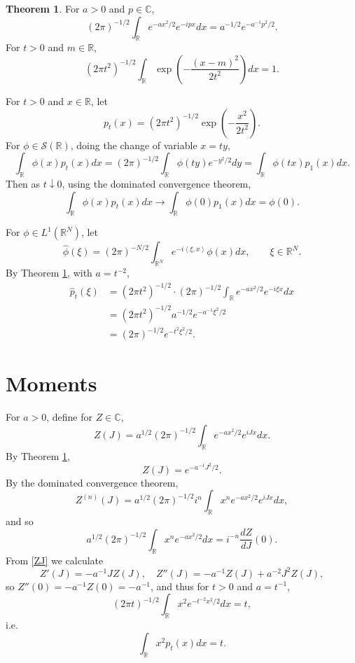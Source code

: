 \documentclass{article}
\newcommand{\inner}[2]{\left\langle #1, #2 \right\rangle}
\theoremstyle{definition}
\newtheorem{theorem}{Theorem}
\theoremstyle{definition}
\begin{document}
\begin{theorem}
For $a > 0$ and $p \in \mathbb{C}$,
\[
(2\pi)^{-1/2} \int_{\mathbb{R}} e^{-ax^2/2} e^{-ipx} dx = a^{-1/2} e^{-a^{-1} p^2 /2}.
\]
For $t>0$ and $m \in \mathbb{R}$,
\[
(2\pi t^2)^{-1/2} \int_{\mathbb{R}} \exp\left(-\frac{(x-m)^2}{2t^2}\right) dx = 1.
\]
\label{gaussian1d}
\end{theorem}

For $t>0$ and $x \in \mathbb{R}$, let
\[
p_t(x) = (2\pi t^2)^{-1/2} \exp\left( - \frac{x^2}{2t^2}\right).
\]
For $\phi \in \mathscr{S}(\mathbb{R})$,
doing the change of variable $x=ty$,
\[
\int_{\mathbb{R}} \phi(x) p_t(x) dx = (2\pi)^{-1/2} \int_{\mathbb{R}} \phi(ty) e^{-y^2/2} dy
=\int_{\mathbb{R}} \phi(tx) p_1(x) dx.
\]
Then as $t \downarrow 0$, using the dominated convergence theorem,
\[
\int_{\mathbb{R}} \phi(x) p_t(x) dx \to \int_{\mathbb{R}} \phi(0) p_1(x) dx = \phi(0).
\]

For $\phi \in L^1(\mathbb{R}^N)$, let
\[
\widehat{\phi}(\xi) = (2\pi)^{-N/2} \int_{\mathbb{R}^N} e^{-i\inner{\xi}{x}} \phi(x) dx,\qquad
\xi \in \mathbb{R}^N.
\]
By Theorem \ref{gaussian1d}, with $a=t^{-2}$,
\begin{align*}
\widehat{p}_t(\xi) &= (2\pi t^2)^{-1/2} \cdot (2\pi)^{-1/2}  \int_{\mathbb{R}} e^{-ax^2/2} e^{-i\xi x}  dx\\
&=(2\pi t^2)^{-1/2} a^{-1/2} e^{-a^{-1} \xi^2/2}\\
&=(2\pi)^{-1/2} e^{-t^2 \xi^2/2}.
\end{align*}



\section{Moments}
For $a>0$, define for $Z \in \mathbb{C}$,
\[
Z(J) = a^{1/2} (2\pi)^{-1/2} \int_{\mathbb{R}} e^{-ax^2/2} e^{iJx} dx.
\]
By Theorem \ref{gaussian1d},
\begin{equation}
Z(J) = e^{-a^{-1} J^2/2}.
\label{ZJ}
\end{equation}
By the dominated convergence theorem,
\[
Z^{(n)}(J) = a^{1/2} (2\pi)^{-1/2} i^n  \int_{\mathbb{R}} x^n e^{-ax^2/2} e^{iJx} dx,
\]
and so 
\[
a^{1/2} (2\pi)^{-1/2} \int_{\mathbb{R}} x^n e^{-ax^2/2} dx = i^{-n} \frac{dZ}{dJ}(0).
\]
From \eqref{ZJ} 
we calculate
\[
Z'(J) = -a^{-1}J Z(J),
\quad Z''(J) = -a^{-1} Z(J) + a^{-2} J^2 Z(J),
\]
so $Z''(0)=-a^{-1} Z(0) = -a^{-1}$, and thus for $t>0$ and $a=t^{-1}$,
\[
(2\pi t)^{-1/2} \int_{\mathbb{R}} x^2 e^{-t^{-2} x^2/2} dx = t,
\]
i.e.
\[
\int_{\mathbb{R}} x^2 p_t(x) dx = t.
\]
\end{document}
